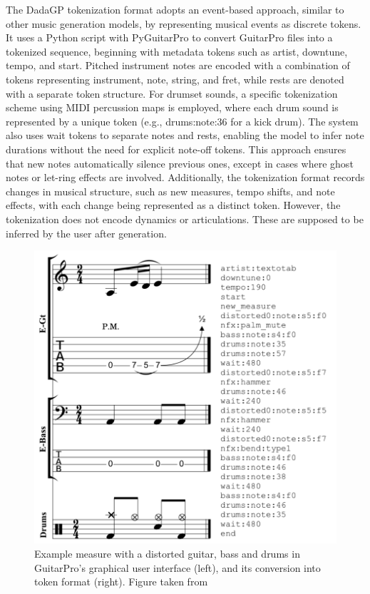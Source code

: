 The DadaGP tokenization format adopts an event-based approach, similar to other music generation models, by representing musical events as discrete tokens.
It uses a Python script with PyGuitarPro to convert GuitarPro files into a tokenized sequence, beginning with metadata tokens such as artist, downtune, tempo, and start.
Pitched instrument notes are encoded with a combination of tokens representing instrument, note, string, and fret, while rests are denoted with a separate token structure.
For drumset sounds, a specific tokenization scheme using MIDI percussion maps is employed, where each drum sound is represented by a unique token (e.g., drums:note:36 for a kick drum).
The system also uses wait tokens to separate notes and rests, enabling the model to infer note durations without the need for explicit note-off tokens.
This approach ensures that new notes automatically silence previous ones, except in cases where ghost notes or let-ring effects are involved.
Additionally, the tokenization format records changes in musical structure, such as new measures, tempo shifts, and note effects, with each change being represented as a distinct token.
However, the tokenization does not encode dynamics or articulations. These are supposed to be inferred by the user after generation.


\begin{figure}[h!]
    \centering
    \includegraphics[width=.5\linewidth]{../images-figures/dadagp_tokenization_example_measure.png}
    \caption{Example measure with a distorted guitar, bass and drums in GuitarPro’s graphical user interface (left), and its conversion into token format (right). Figure taken from \cite{sarmento_dadagp_2021}}
    \label{fig:dadagp_tokenization}
\end{figure}



